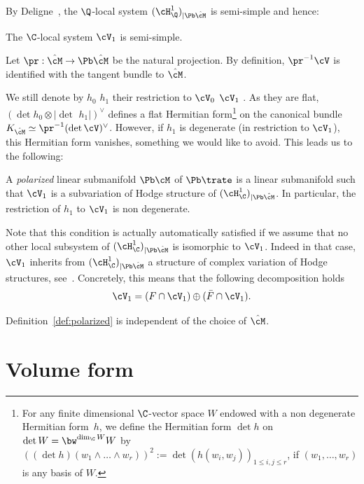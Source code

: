 By Deligne~\cite{Deligne:TH2}, the $\Q$-local system $(\cH^1_{\Q})_{|\Pb\hat\cM}$ is semi-simple and hence:
\begin{Proposition}
The $\C$-local system $\cV_1$ is semi-simple.
\end{Proposition}

\begin{Remark}\label{rk:loc:syst:tangent:bdl}
Let $\pr: \hat{\cM} \to \Pb\hat{\cM}$ be the natural projection. By definition, ${\pr}^{-1}\cV$ is identified with the tangent bundle to $\hat\cM$.
\end{Remark}

We still denote by $h_0$ \resp $h_1$ their restriction to $\cV_0$ \resp $\cV_1$ . As they are flat, $(\det h_0 \otimes |{\det\,}\, h_1|)^\vee$ defines a flat Hermitian form\footnote{For any finite dimensional $\C$-vector space $W$ endowed with a non degenerate Hermitian form~$h$, we define the Hermitian form $\det h$ on $\det W=\bw^{\dim_\C W} W$ by $((\det h)(w_1\wedge\dots\wedge w_r))^2:=\det (h(w_i,w_j))_{1\leq i,j\leq r}$, if $(w_1,\dots,w_r)$ is any basis of $W$.}
on the canonical bundle $K_{\hat\cM}\simeq\pr^{-1}(\det \cV)^\vee$.
However, if $h_1$ is degenerate (in restriction to $\cV_1$), this Hermitian form vanishes, something we would like to avoid. This leads us to the following:

\begin{Definition}\label{def:polarized}
A \emph{polarized} linear submanifold $\Pb\cM$ of $\Pb\trate$ is a linear submanifold such that $\cV_1$ is a subvariation of Hodge structure of $(\cH^1_\C)_{|\Pb\hat\cM}$. In particular, the restriction of $h_1$ to $\cV_1$ is non degenerate.
\end{Definition}

Note that this condition is actually automatically satisfied if we assume that no other local subsystem of $(\cH^1_{\C})_{|\Pb\hat\cM}$ is isomorphic to $\cV_1$. Indeed in that case, $\cV_1$ inherits from $(\cH^1_{\C})_{|\Pb\hat\cM}$ a structure of complex variation of Hodge structures, see~\cite[-13]{Deligne:TFM}.
Concretely, this means that the following decomposition holds
\[\cV_1 = (F \cap \cV_1) \oplus (\bar F \cap \cV_1).\]

\begin{Remark}\label{rk:choice:of:cover}
Definition~\ref{def:polarized} is independent of the choice of $\hat\cM$.
\end{Remark}

\section{Volume form}\label{sec:volform}


